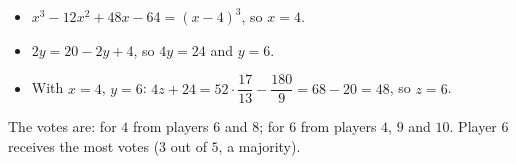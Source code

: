 \begin{itemize}
\item $x^3-12x^2+48x-64=(x-4)^3$, so $x=4$.
\item $2y=20-2y+4$, so $4y=24$ and $y=6$.
\item With $x=4$, $y=6$: $4z+24=52\cdot\dfrac{17}{13}-\dfrac{180}{9}=68-20=48$, so $z=6$.
\end{itemize}
The votes are: for $4$ from players $6$ and $8$; for $6$ from players $4$, $9$ and $10$. Player $\boxed{6}$ receives the most votes ($3$ out of $5$, a majority).
